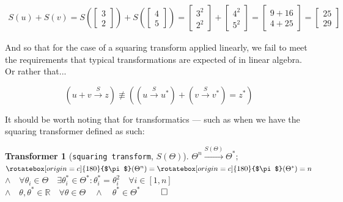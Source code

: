 \documentclass[a4paper, 18pt]{book} %
\newtheorem{transf}{Transformer}
\newcommand{\invpi}{\rotatebox[origin=c]{180}{$\pi$}}
\begin{document}
\begin{appendices}
\vspace{2em}


\begin{multline}
\label{EQSQUARTRANS2}
S(u) + S(v) = S\left( \begin{bmatrix}3\\2\end{bmatrix} \right) +  S\left( \begin{bmatrix}4\\5\end{bmatrix} \right) = \begin{bmatrix}3^2\\2^2\end{bmatrix}  +   \begin{bmatrix}4^2\\5^2\end{bmatrix} = \begin{bmatrix}9+16\\4+25\end{bmatrix} = \begin{bmatrix}25\\29\end{bmatrix}
\end{multline}


\vspace{2em}

And so that for the case of a squaring transform applied linearly, we fail to meet the requirements that typical transformations are expected of in linear algebra. Or rather that...


\vspace{2em}

\begin{equation}
\label{EQAXIOMALG2}
(u + v \xrightarrow{S} z) \not\equiv ((u \xrightarrow{S} u^*) + (v \xrightarrow{S} v^*) = z^*)
\end{equation}


\vspace{2em}



It should be worth noting that for transformatics --- such as when we have the squaring transformer defined as such:

\vspace{2em}

\begin{transf}[\texttt{squaring transform}, $S(\Theta)$]
\label{TRANSSQUAR}
$\Theta^n \xrightarrow{S(\Theta)} \Theta^*;$\\
$\invpi(\Theta^n) = \invpi(\Theta^*) = n$\\
$\land \quad \forall \theta_i \in \Theta \quad \exists \theta_i^* \in \Theta^* : \theta_i^* = \theta_i^2 \quad \forall i \in [1,n]$\\
$\land \quad \theta, \theta^* \in \mathbb{R} \quad \forall \theta \in \Theta \quad \land \quad \theta^* \in \Theta^*$
$\qed$
\end{transf}


\end{appendices}
\end{document}

